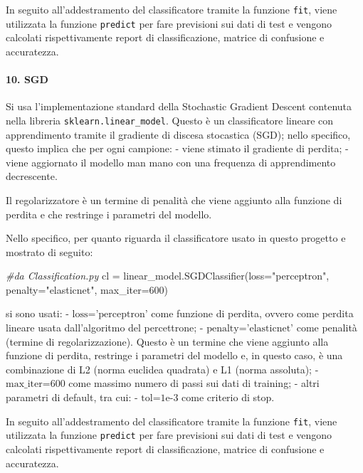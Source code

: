 \documentclass[11pt]{article}
\newenvironment{Shaded}{}{}
\newcommand{\DecValTok}[1]{\textcolor[rgb]{0.25,0.63,0.44}{{#1}}}
\newcommand{\StringTok}[1]{\textcolor[rgb]{0.25,0.44,0.63}{{#1}}}
\newcommand{\CommentTok}[1]{\textcolor[rgb]{0.38,0.63,0.69}{\textit{{#1}}}}
\newcommand{\NormalTok}[1]{{#1}}
\newcommand{\OperatorTok}[1]{\textcolor[rgb]{0.40,0.40,0.40}{{#1}}}
\begin{document}
In seguito all'addestramento del classificatore tramite la funzione
\texttt{fit}, viene utilizzata la funzione \texttt{predict} per fare
previsioni sui dati di test e vengono calcolati rispettivamente report
di classificazione, matrice di confusione e accuratezza.

    \paragraph{10. SGD}\label{sgd}

    Si usa l'implementazione standard della Stochastic Gradient Descent
contenuta nella libreria \texttt{sklearn.linear\_model}. Questo è un
classificatore lineare con apprendimento tramite il gradiente di discesa
stocastica (SGD); nello specifico, questo implica che per ogni campione:
- viene stimato il gradiente di perdita; - viene aggiornato il modello
man mano con una frequenza di apprendimento decrescente.

Il regolarizzatore è un termine di penalità che viene aggiunto alla
funzione di perdita e che restringe i parametri del modello.

Nello specifico, per quanto riguarda il classificatore usato in questo
progetto e mostrato di seguito:

\begin{Shaded}
\begin{Highlighting}[]
\CommentTok{#da Classification.py}
\NormalTok{cl }\OperatorTok{=}\NormalTok{ linear_model.SGDClassifier(loss}\OperatorTok{=}\StringTok{"perceptron"}\NormalTok{, penalty}\OperatorTok{=}\StringTok{"elasticnet"}\NormalTok{, max_iter}\OperatorTok{=}\DecValTok{600}\NormalTok{)   }
\end{Highlighting}
\end{Shaded}

si sono usati: - \(\text{loss='perceptron'}\) come funzione di perdita,
ovvero come perdita lineare usata dall'algoritmo del percettrone; -
\(\text{penalty='elasticnet'}\) come penalità (termine di
regolarizzazione). Questo è un termine che viene aggiunto alla funzione
di perdita, restringe i parametri del modello e, in questo caso, è una
combinazione di L2 (norma euclidea quadrata) e L1 (norma assoluta); -
\(\text{max_iter=600}\) come massimo numero di passi sui dati di
training; - altri parametri di default, tra cui: - \(\text{tol=1e-3}\)
come criterio di stop.

In seguito all'addestramento del classificatore tramite la funzione
\texttt{fit}, viene utilizzata la funzione \texttt{predict} per fare
previsioni sui dati di test e vengono calcolati rispettivamente report
di classificazione, matrice di confusione e accuratezza.
\end{document}
